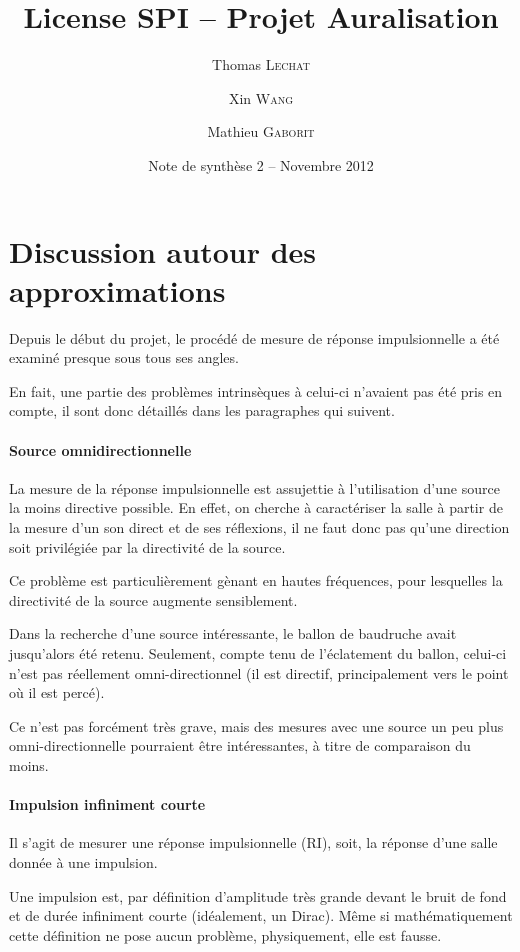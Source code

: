 \documentclass[12pt]{article}
\title{License SPI -- Projet Auralisation}
\author{Thomas \textsc{Lechat} \and Xin \textsc{Wang} \and Mathieu \textsc{Gaborit}}
\date{Note de synthèse 2 -- Novembre 2012}
\begin{document}
 \maketitle

\tableofcontents
\newpage

\section{Discussion autour des approximations} %

Depuis le début du projet, le procédé de mesure de réponse impulsionnelle a été examiné presque sous tous ses angles.

En fait, une partie des problèmes intrinsèques à celui-ci n'avaient pas été pris en compte, il sont donc détaillés dans
les paragraphes qui suivent.

\paragraph{Source omnidirectionnelle}

La mesure de la réponse impulsionnelle est assujettie à l'utilisation d'une source la moins directive possible.
En effet, on cherche à caractériser la salle à partir de la mesure d'un son direct et de ses réflexions, il ne faut donc
pas qu'une direction soit privilégiée par la directivité de la source.

Ce problème est particulièrement gènant en hautes fréquences, pour lesquelles la directivité de la source augmente
sensiblement.

Dans la recherche d'une source intéressante, le ballon de baudruche avait jusqu'alors été retenu.
Seulement, compte tenu de l'éclatement du ballon, celui-ci n'est pas réellement omni-directionnel (il est directif,
principalement vers le point où il est percé).

Ce n'est pas forcément très grave, mais des mesures avec une source un peu plus omni-directionnelle pourraient être
intéressantes, à titre de comparaison du moins.

\paragraph{Impulsion infiniment courte}

Il s'agit de mesurer une réponse impulsionnelle (RI), soit, la réponse d'une salle donnée à une impulsion.

Une impulsion est, par définition d'amplitude très grande devant le bruit de fond et de durée infiniment courte
(idéalement, un Dirac). Même si mathématiquement cette définition ne pose aucun problème, physiquement, elle est
fausse.
\end{document}
